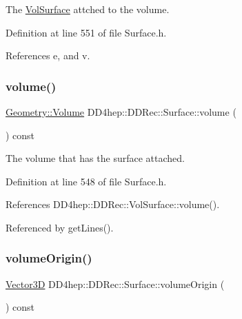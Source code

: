 The \hyperlink{class_d_d4hep_1_1_d_d_rec_1_1_vol_surface}{Vol\+Surface} attched to the volume. 



Definition at line 551 of file Surface.\+h.



References e, and v.

\hypertarget{class_d_d4hep_1_1_d_d_rec_1_1_surface_a739dcf7968a8b870744151b1ee99a3c4}{}\label{class_d_d4hep_1_1_d_d_rec_1_1_surface_a739dcf7968a8b870744151b1ee99a3c4} 
\subsubsection{\texorpdfstring{volume()}{volume()}}
{\footnotesize\ttfamily \hyperlink{class_d_d4hep_1_1_geometry_1_1_volume}{Geometry\+::\+Volume} D\+D4hep\+::\+D\+D\+Rec\+::\+Surface\+::volume (\begin{DoxyParamCaption}{ }\end{DoxyParamCaption}) const\hspace{0.3cm}{\ttfamily [inline]}}



The volume that has the surface attached. 



Definition at line 548 of file Surface.\+h.



References D\+D4hep\+::\+D\+D\+Rec\+::\+Vol\+Surface\+::volume().



Referenced by get\+Lines().

\hypertarget{class_d_d4hep_1_1_d_d_rec_1_1_surface_aef5510d93d3621e54f95fd3c62f8e5b3}{}\label{class_d_d4hep_1_1_d_d_rec_1_1_surface_aef5510d93d3621e54f95fd3c62f8e5b3} 
\subsubsection{\texorpdfstring{volume\+Origin()}{volumeOrigin()}}
{\footnotesize\ttfamily \hyperlink{class_d_d_surfaces_1_1_vector3_d}{Vector3D} D\+D4hep\+::\+D\+D\+Rec\+::\+Surface\+::volume\+Origin (\begin{DoxyParamCaption}{ }\end{DoxyParamCaption}) const\hspace{0.3cm}{\ttfamily [virtual]}}


